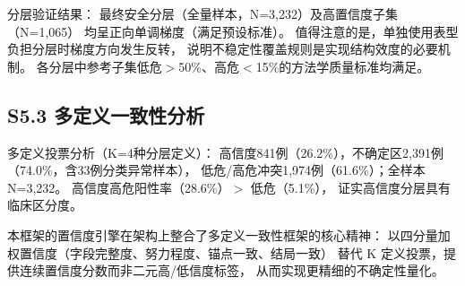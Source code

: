 \documentclass[12pt, a4paper]{ctexart}
\begin{document}
分层验证结果：
最终安全分层（全量样本，N=3,232）及高置信度子集（N=1,065）
均呈正向单调梯度（满足预设标准）。
值得注意的是，单独使用表型负担分层时梯度方向发生反转，
说明不稳定性覆盖规则是实现结构效度的必要机制。
各分层中参考子集低危$>$50\%、高危$<$15\%的方法学质量标准均满足。

\subsection*{S5.3 多定义一致性分析}

多定义投票分析（K=4种分层定义）：
高信度841例（26.2\%），不确定区2,391例（74.0\%，含33例分类异常样本），
低危/高危冲突1,974例（61.6\%）；全样本N=3,232。
高信度高危阳性率（28.6\%）$>$ 低危（5.1\%），
证实高信度分层具有临床区分度。

本框架的置信度引擎在架构上整合了多定义一致性框架的核心精神：
以四分量加权置信度（字段完整度、努力程度、锚点一致、结局一致）
替代 K 定义投票，提供连续置信度分数而非二元高/低信度标签，
从而实现更精细的不确定性量化。

% 
\end{document}
